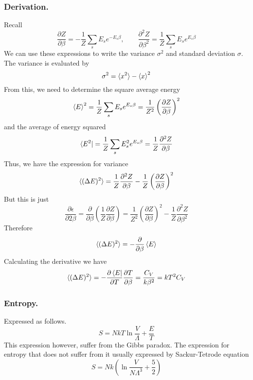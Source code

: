 \documentclass[../../../Main.tex]{subfiles}
\begin{document}
\subsubsection*{Derivation.}
Recall 
\begin{equation*}
	\frac{\partial Z}{\partial \beta}=-\frac{1}{Z}\sum_sE_se^{-E_s\beta},\qquad\frac{\partial^2Z}{\partial \beta^2}=\frac{1}{Z}\sum_sE_se^{E_s\beta}
\end{equation*}
We can use these expressions to write the variance $\sigma^2$ and standard deviation $\sigma$. 
The variance is evaluated by
\begin{equation*}
	\sigma^2=\braket{x^2}-\braket{x}^2
\end{equation*}
From this, we need to determine the square average energy 
\begin{equation*}
	\braket{E}^2=\frac{1}{Z}\sum_s E_se^{E_s\beta}=\frac{1}{Z^2}\left(\frac{\partial Z}{\partial \beta}\right)^2
\end{equation*}
and the average of energy squared
\begin{equation*}
	\bra{E^2}=\frac{1}{Z}\sum_sE_s^2e^{E_s\beta}=\frac{1}{Z}\frac{\partial^2Z}{\partial\beta}
\end{equation*}
Thus, we have the expression for variance
\begin{equation*}
	\braket{(\Delta E)^2}=\frac{1}{Z}\frac{\partial^2Z}{\partial\beta}-\frac{1}{Z}\left(\frac{\partial Z}{\partial \beta}\right)^2
\end{equation*}
But this is just 
\begin{equation*}
	\frac{\partial \epsilon}{\partial 2\beta}=\frac{\partial}{\partial \beta}\left(\frac{1}{Z}\frac{\partial Z}{\partial \beta}\right)=\frac{1}{Z^2}\left(\frac{\partial Z}{\partial \beta}\right)^2-\frac{1}{Z}\frac{\partial^2Z}{\partial\beta^2}
\end{equation*}
Therefore
\begin{equation*}
	\braket{(\Delta E )^2}=-\frac{\partial }{\partial\beta}\braket{E}
\end{equation*}
Calculating the derivative we have 
\begin{equation*}
	\braket{(\Delta E )^2}=-\frac{\partial\bra{E}}{\partial T}\frac{\partial T}{\partial \beta}=\frac{C_V}{k\beta^2}=kT^2C_V
\end{equation*}

\subsubsection*{Entropy.} Expressed as follows.
\begin{equation*}
	S=NkT\ln \frac{V}{\Lambda}+\frac{E}{T}
\end{equation*}
This expression however, suffer from the Gibbs paradox. The expression for entropy that does not suffer from it usually expressed by Sackur-Tetrode equation
\begin{equation*}
	S=Nk\left(\ln\frac{V}{N\Lambda^3}+\frac{5}{2}\right)
\end{equation*}
\end{document}
